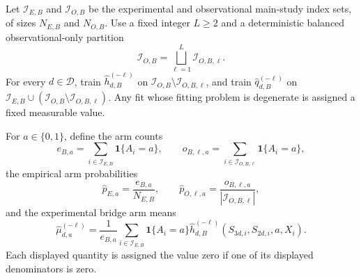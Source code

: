 Let \(\mathcal I_{E,B}\) and \(\mathcal I_{O,B}\) be the experimental and observational main-study index sets, of sizes \(N_{E,B}\) and \(N_{O,B}\). Use a fixed integer \(L\ge2\) and a deterministic balanced observational-only partition
\[
 \mathcal I_{O,B}=\bigsqcup_{\ell=1}^L\mathcal I_{O,B,\ell}.
\]
For every \(d\in\mathcal D\), train \(\widehat h_{d,B}^{(-\ell)}\) on \(\mathcal I_{O,B}\setminus\mathcal I_{O,B,\ell}\), and train \(\widehat q_{d,B}^{(-\ell)}\) on \(\mathcal I_{E,B}\cup(\mathcal I_{O,B}\setminus\mathcal I_{O,B,\ell})\). Any fit whose fitting problem is degenerate is assigned a fixed measurable value.

For \(a\in\{0,1\}\), define the arm counts
\[
 e_{B,a}=\sum_{i\in\mathcal I_{E,B}}\mathbf 1\{A_i=a\},
 \qquad
 o_{B,\ell,a}=\sum_{i\in\mathcal I_{O,B,\ell}}\mathbf 1\{A_i=a\},
\]
the empirical arm probabilities
\[
 \widehat p_{E,a}=\frac{e_{B,a}}{N_{E,B}},
 \qquad
 \widehat p_{O,\ell,a}=\frac{o_{B,\ell,a}}{|\mathcal I_{O,B,\ell}|},
\]
and the experimental bridge arm means
\[
 \widehat\mu_{d,a}^{(-\ell)}
 =\frac1{e_{B,a}}
 \sum_{i\in\mathcal I_{E,B}}\mathbf 1\{A_i=a\}
 \widehat h_{d,B}^{(-\ell)}(S_{3d,i},S_{2d,i},a,X_i).
\]
Each displayed quantity is assigned the value zero if one of its displayed denominators is zero.

